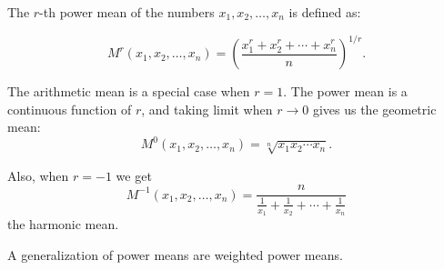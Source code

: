 \documentclass[12pt]{article}
\begin{document}
The $r$-th power mean of the numbers $x_1,x_2,\ldots,x_n$ is defined as:

$$M^r(x_1,x_2,\ldots,x_n)=\left(\frac{x_1^r+x_2^r+\cdots+x_n^r}{n}\right)^{1/r}.$$
\smallskip

The arithmetic mean is a special case when $r=1$.
The power mean is a continuous function of $r$, and taking limit when $r\to0$ gives us the geometric mean:
$$M^0(x_1,x_2,\ldots,x_n)=\sqrt[n]{x_1 {x_{2}} \cdots x_n}.$$
\smallskip

Also, when $r=-1$ we get
$$M^{-1}(x_1,x_2,\ldots,x_n)=\frac{n}{\frac{1}{x_1}+\frac{1}{x_2}+\cdots+\frac{1}{x_n}}$$
the harmonic mean.

A generalization of power means are weighted power means.
\end{document}
